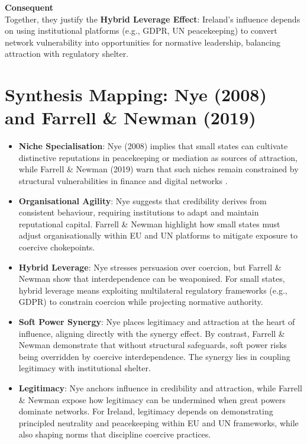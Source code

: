 \textbf{Consequent} \\  
Together, they justify the \textbf{Hybrid Leverage Effect}: Ireland’s influence depends on using institutional platforms (e.g., GDPR, UN peacekeeping) to convert network vulnerability into opportunities for normative leadership, balancing attraction with regulatory shelter.



\section*{Synthesis Mapping: Nye (2008) and Farrell \& Newman (2019)}

\begin{itemize}
	\item \textbf{Niche Specialisation}: Nye (2008) implies that small states can cultivate distinctive reputations in peacekeeping or mediation as sources of attraction, while Farrell \& Newman (2019) warn that such niches remain constrained by structural vulnerabilities in finance and digital networks \parencite{NYE_2008,FARRELL_2019}.
	
	\item \textbf{Organisational Agility}: Nye suggests that credibility derives from consistent behaviour, requiring institutions to adapt and maintain reputational capital. Farrell \& Newman highlight how small states must adjust organisationally within EU and UN platforms to mitigate exposure to coercive chokepoints.
	
	\item \textbf{Hybrid Leverage}: Nye stresses persuasion over coercion, but Farrell \& Newman show that interdependence can be weaponised. For small states, hybrid leverage means exploiting multilateral regulatory frameworks (e.g., GDPR) to constrain coercion while projecting normative authority.
	
	\item \textbf{Soft Power Synergy}: Nye places legitimacy and attraction at the heart of influence, aligning directly with the synergy effect. By contrast, Farrell \& Newman demonstrate that without structural safeguards, soft power risks being overridden by coercive interdependence. The synergy lies in coupling legitimacy with institutional shelter.
	
	\item \textbf{Legitimacy}: Nye anchors influence in credibility and attraction, while Farrell \& Newman expose how legitimacy can be undermined when great powers dominate networks. For Ireland, legitimacy depends on demonstrating principled neutrality and peacekeeping within EU and UN frameworks, while also shaping norms that discipline coercive practices.
\end{itemize}

